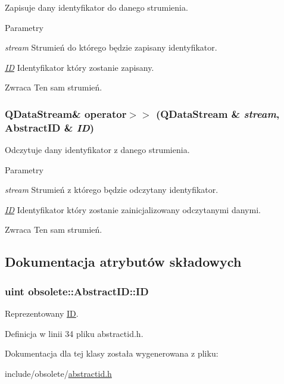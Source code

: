 Zapisuje dany identyfikator do danego strumienia. 


\begin{DoxyParams}{Parametry}
\item[{\em stream}]Strumień do którego będzie zapisany identyfikator. \item[{\em \hyperlink{classobsolete_1_1ID}{ID}}]Identyfikator który zostanie zapisany. \end{DoxyParams}
\begin{DoxyReturn}{Zwraca}
Ten sam strumień. 
\end{DoxyReturn}
\hypertarget{classobsolete_1_1AbstractID_ae2290b15582443d09db5f4963e546920}{
\subsubsection[{operator$>$$>$}]{\setlength{\rightskip}{0pt plus 5cm}QDataStream\& operator$>$$>$ (QDataStream \& {\em stream}, \/  {\bf AbstractID} \& {\em ID})}}
\label{classobsolete_1_1AbstractID_ae2290b15582443d09db5f4963e546920}


Odczytuje dany identyfikator z danego strumienia. 


\begin{DoxyParams}{Parametry}
\item[{\em stream}]Strumień z którego będzie odczytany identyfikator. \item[{\em \hyperlink{classobsolete_1_1ID}{ID}}]Identyfikator który zostanie zainicjalizowany odczytanymi danymi. \end{DoxyParams}
\begin{DoxyReturn}{Zwraca}
Ten sam strumień. 
\end{DoxyReturn}


\subsection{Dokumentacja atrybutów składowych}
\hypertarget{classobsolete_1_1AbstractID_a5f67fa1c7d96085f0ef41193b60b570c}{
\subsubsection[{ID}]{\setlength{\rightskip}{0pt plus 5cm}uint {\bf obsolete::AbstractID::ID}}}
\label{classobsolete_1_1AbstractID_a5f67fa1c7d96085f0ef41193b60b570c}


Reprezentowany \hyperlink{classobsolete_1_1ID}{ID}. 



Definicja w linii 34 pliku abstractid.h.



Dokumentacja dla tej klasy została wygenerowana z pliku:\begin{DoxyCompactItemize}
\item 
include/obsolete/\hyperlink{abstractid_8h}{abstractid.h}\end{DoxyCompactItemize}
